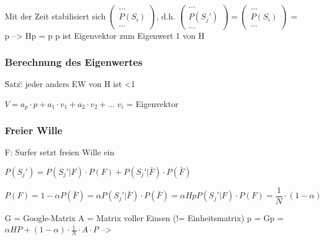 \documentclass[10pt,a4paper]{scrartcl}
\begin{document}
Mit der Zeit stabilisiert sich $\begin{pmatrix}
\dots \\
P(S_{i}) \\
\dots
\end{pmatrix}$, d.h. $\begin{pmatrix}
\dots \\
P(S_{j}') \\
\dots
\end{pmatrix} = \begin{pmatrix}
\dots \\
P(S_{i}) \\
\dots
\end{pmatrix}$ = p --> Hp = p
p ist Eigenvektor zum Eigenwert 1 von H

\subsubsection{Berechnung des Eigenwertes}
\"Satz\": jeder anders EW von H ist <1 %

$V = a_{p}\cdot p + a_{1}\cdot v_{1} + a_{2}\cdot v_{2} + ...$
$v_{i}$ = Eigenvektor

\subsubsection{Freier Wille}
F: Surfer setzt freien Wille ein

$P(S_{j}') = P(S_{j}'|F)\cdot P(F) + P(S_{j}'|\bar{F})\cdot P(\bar{F})$

$$P(F) = 1-\alpha
P(\bar{F}) = \alpha
P(S_{j}'|\bar{F})\cdot P(\bar{F}) = \alpha Hp
P(S_{j}'|F)\cdot P(F) = \frac{1}{N}\cdot (1-\alpha)$$

G = Google-Matrix
A = Matrix voller Einsen (!= Einheitsmatrix)
p = Gp = $\alpha HP + (1-\alpha)\cdot \frac{1}{N}\cdot A\cdot P$ --> 
\end{document}
